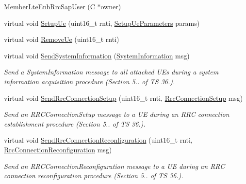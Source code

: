 \begin{DoxyCompactItemize}
\item 
\hyperlink{classns3_1_1MemberLteEnbRrcSapUser_adc2ea4b5f5e0a896a5687c4accd6e2c7}{Member\+Lte\+Enb\+Rrc\+Sap\+User} (\hyperlink{loss__COST231__small__cities__urban_8m_aaa53ca0b650dfd85c4f59fa156f7a2cc}{C} $\ast$owner)
\item 
virtual void \hyperlink{classns3_1_1MemberLteEnbRrcSapUser_a611076a4c348a6dabd6f18de1ba876e5}{Setup\+Ue} (uint16\+\_\+t rnti, \hyperlink{structns3_1_1LteEnbRrcSapUser_1_1SetupUeParameters}{Setup\+Ue\+Parameters} params)
\item 
virtual void \hyperlink{classns3_1_1MemberLteEnbRrcSapUser_abe120f38ad5163993823beeb28a500f2}{Remove\+Ue} (uint16\+\_\+t rnti)
\item 
virtual void \hyperlink{classns3_1_1MemberLteEnbRrcSapUser_a66a597ce5e108aa2e6c7cf0d59e06b53}{Send\+System\+Information} (\hyperlink{structns3_1_1LteRrcSap_1_1SystemInformation}{System\+Information} msg)
\begin{DoxyCompactList}\small\item\em Send a {\itshape System\+Information} message to all attached U\+Es during a system information acquisition procedure (Section 5.. of TS 36.). \end{DoxyCompactList}\item 
virtual void \hyperlink{classns3_1_1MemberLteEnbRrcSapUser_af7fdf14cd74b83bc6969fedce515bd0c}{Send\+Rrc\+Connection\+Setup} (uint16\+\_\+t rnti, \hyperlink{structns3_1_1LteRrcSap_1_1RrcConnectionSetup}{Rrc\+Connection\+Setup} msg)
\begin{DoxyCompactList}\small\item\em Send an {\itshape R\+R\+C\+Connection\+Setup} message to a UE during an R\+RC connection establishment procedure (Section 5.. of TS 36.). \end{DoxyCompactList}\item 
virtual void \hyperlink{classns3_1_1MemberLteEnbRrcSapUser_a6d95791cc6b85abfa1f10a2072da838d}{Send\+Rrc\+Connection\+Reconfiguration} (uint16\+\_\+t rnti, \hyperlink{structns3_1_1LteRrcSap_1_1RrcConnectionReconfiguration}{Rrc\+Connection\+Reconfiguration} msg)
\begin{DoxyCompactList}\small\item\em Send an {\itshape R\+R\+C\+Connection\+Reconfiguration} message to a UE during an R\+RC connection reconfiguration procedure (Section 5.. of TS 36.). \end{DoxyCompactList}\item 

\end{DoxyCompactItemize}
